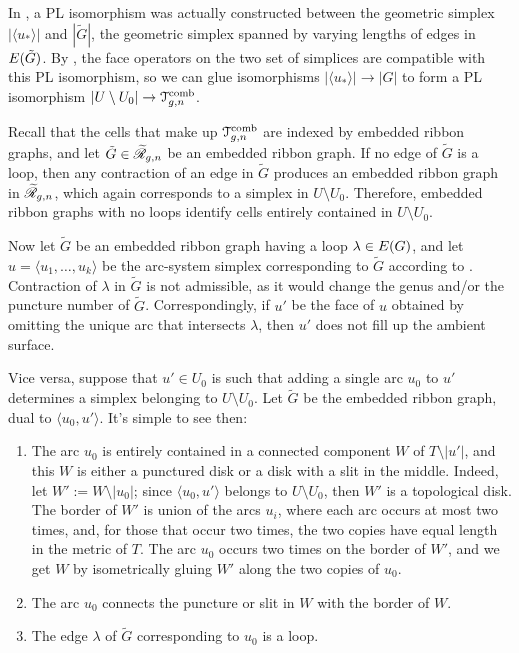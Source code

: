 In , a PL isomorphism was actually constructed
between the geometric simplex $|\langle u_*\rangle|$ and $|\tilde G|$, the
geometric simplex spanned by varying lengths of edges in
$\Edges{\tilde G}$.  By , the face
operators on the two set of simplices are compatible with this PL
isomorphism, so we can glue isomorphisms $|\langle u_*\rangle| \to |G|$ to form a PL
isomorphism $|U \setminus U_0| \to \Tcomb_{g,n}$.

Recall that the cells that make up $\Tcomb_{g,n}$ are indexed by
embedded ribbon graphs, and let $\tilde G \in \ERG[g,n]$ be an embedded
ribbon graph. If no edge of $\tilde G$ is a loop, then any contraction
of an edge in $\tilde G$ produces an embedded ribbon graph in
$\ERG[g,n]$, which again corresponds to a simplex in $U \setminus U_0$.
Therefore, embedded ribbon graphs with no loops identify cells
entirely contained in $U \setminus U_0$. 

Now let $\tilde G$ be an embedded ribbon graph having a loop $\lambda \in
\Edges{G}$, and let $u = \langle u_1, \ldots, u_k\rangle$ be the arc-system simplex
corresponding to $\tilde G$ according to .
Contraction of $\lambda$ in $\tilde G$ is not admissible, as it would change
the genus and/or the puncture number of $\tilde G$.  Correspondingly,
if $u'$ be the face of $u$ obtained by omitting the unique arc
that intersects $\lambda$, then $u'$ does not fill up the ambient surface.

Vice versa, suppose that $u' \in U_0$ is such that adding a single arc
$u_0$ to $u'$ determines a simplex belonging to $U \setminus U_0$.  Let
$\tilde G$ be the embedded ribbon graph, dual to $\langle u_0, u'\rangle$.  It's
simple to see then:
\begin{enumerate}
\item The arc $u_0$ is entirely contained in a connected component $W$
  of $T \setminus |u'|$, and this $W$ is either a punctured disk or a disk
  with a slit in the middle.  Indeed, let $W' := W \setminus |u_0|$; since
  $\langle u_0, u'\rangle$ belongs to $U \setminus U_0$, then $W'$ is a topological disk.
  The border of $W'$ is union of the arcs $u_i$, where each arc occurs
  at most two times, and, for those that occur two times, the two
  copies have equal length in the metric of $T$.  The arc $u_0$ occurs
  two times on the border of $W'$, and we get $W$ by isometrically
  gluing $W'$ along the two copies of $u_0$. 
\item The arc $u_0$ connects the puncture or slit in $W$ with the
  border of $W$.
\item The edge $\lambda$ of $\tilde G$ corresponding to $u_0$ is a loop.
\end{enumerate}

